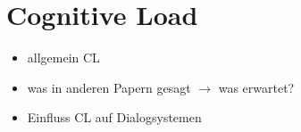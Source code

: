 \documentclass[12pt,a4paper]{scrartcl}
\begin{document}

\section{Cognitive Load}
\begin{itemize}
\item allgemein CL
\item was in anderen Papern gesagt $\rightarrow$ was erwartet?
\item Einfluss CL auf Dialogsystemen
\end{itemize}
\end{document}
